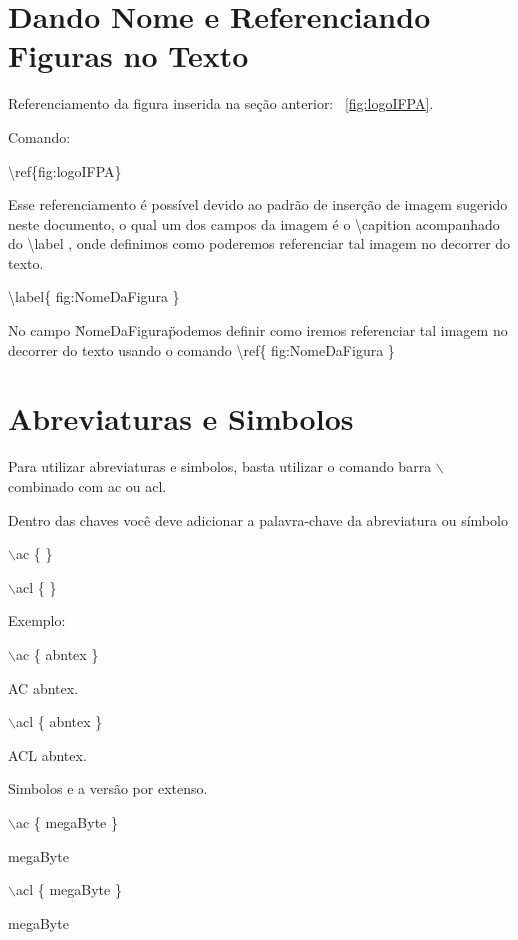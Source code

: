 \section{Dando Nome e Referenciando Figuras no Texto}
	
Referenciamento da figura inserida na seção anterior: ~\autoref{fig:logoIFPA}.

\hfill

Comando:

\textbackslash ref\{fig:logoIFPA\}

\hfill

Esse referenciamento é possível devido ao padrão de inserção de imagem sugerido neste documento, o qual um dos campos da imagem é o \textbackslash capition acompanhado do \textbackslash label , onde definimos como poderemos referenciar tal imagem no decorrer do texto.

\hfill

\textbackslash label\{ fig:NomeDaFigura \}

\hfill

No campo \"NomeDaFigura\" podemos definir como iremos referenciar tal imagem no decorrer do texto usando o comando \textbackslash ref\{ fig:NomeDaFigura \}

\section{Abreviaturas e Simbolos}

Para utilizar abreviaturas e simbolos, basta utilizar o comando barra $\backslash$ combinado com ac ou acl.

Dentro das chaves você deve adicionar a palavra-chave da abreviatura ou símbolo

$\backslash$ac \{ \}

$\backslash$acl \{ \}

\hfill

Exemplo:

$\backslash$ac \{ abntex \}

AC \ac{abntex}.

$\backslash$acl \{ abntex \}

ACL \acl{abntex}.

\hfill

Simbolos e a versão por extenso.

$\backslash$ac \{ megaByte \}

\ac{megaByte}

$\backslash$acl \{ megaByte \}

\acl{megaByte}


